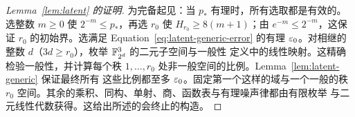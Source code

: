 \begin{proof}[Lemma~\ref{lem:latent} 的证明]
为完备起见：当 $p_*$ 有理时，所有选取都是有效的。选整数 $m\ge0$
使 $2^{-m}\le p_*$，再选 $r_0$ 使 $H_{r_0}\ge8(m+1)$；由
$e^{-m}\le2^{-m}$，这保证 $r_0$ 的初始界。选满足
Equation~\eqref{eq:latent-generic-error} 的有理 $\varepsilon_0$。对相继的
整数 $d$（$3d\ge r_0$），枚举 $\mathbb F_{2^d}^3$ 的二元子空间与一般性
定义中的线性映射。这精确检验一般性，并计算每个秩 $1,\ldots,r_0$
处非一般空间的比例。Lemma~\ref{lem:latent-generic} 保证最终所有
这些比例都至多 $\varepsilon_0$。固定第一个这样的域与一个一般的秩 $r_0$
空间。其余的乘积、同构、单射、商、函数表与有理噪声律都由有限枚举
与二元线性代数获得。这给出所述的会终止的构造。
\end{proof}
